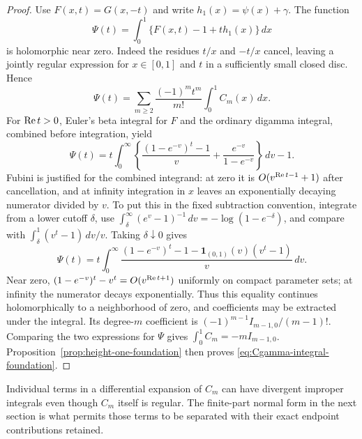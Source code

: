 \begin{proof}
Use $F(x,t)=G(x,-t)$ and write $h_1(x)=\psi(x)+\gamma$. The function
\[
 \Psi(t)=\int_0^1\{F(x,t)-1+t h_1(x)\}\,dx
\]
is holomorphic near zero. Indeed the residues $t/x$ and $-t/x$
cancel, leaving a jointly regular expression for $x\in[0,1]$ and
$t$ in a sufficiently small closed disc. Hence
\[
 \Psi(t)=\sum_{m\ge2}\frac{(-1)^m t^m}{m!}
                                  \int_0^1C_m(x)\,dx.
\]
For $\operatorname{Re} t>0$, Euler's beta integral for $F$ and the ordinary
digamma integral, combined before integration, yield
\[
 \Psi(t)=t\int_0^\infty
   \left\{\frac{(1-e^{-v})^t-1}{v}
                    +\frac{e^{-v}}{1-e^{-v}}\right\}\,dv-1.
\]
Fubini is justified for the combined integrand: at zero it is
$O(v^{\operatorname{Re} t-1}+1)$ after cancellation, and at infinity integration
in $x$ leaves an exponentially decaying numerator divided by $v$.
To put this in the fixed subtraction convention, integrate from a
lower cutoff $\delta$, use
$\int_\delta^\infty(e^v-1)^{-1}\,dv=-\log(1-e^{-\delta})$,
and compare with $\int_\delta^1(v^t-1)\,dv/v$. Taking
$\delta\downarrow0$ gives
\begin{equation}\label{eq:gamma-Psi-foundation}
 \Psi(t)=t\int_0^\infty
 \frac{(1-e^{-v})^t-1
       -\boldsymbol1_{(0,1)}(v)(v^t-1)}v\,dv.
\end{equation}
Near zero, $(1-e^{-v})^t-v^t=O(v^{\operatorname{Re} t+1})$ uniformly on compact
parameter sets; at infinity the numerator decays exponentially.
Thus this equality continues holomorphically to a neighborhood of zero,
and coefficients may be extracted under the integral. Its degree-$m$
coefficient is $(-1)^{m-1}I_{m-1,0}/(m-1)!$.
Comparing the two expressions for $\Psi$ gives
$\int_0^1C_m=-mI_{m-1,0}$. Proposition~\ref{prop:height-one-foundation}
then proves \eqref{eq:Cgamma-integral-foundation}.
\end{proof}

Individual terms in a differential expansion of $C_m$ can have divergent
improper integrals even though $C_m$ itself is regular. The finite-part
normal form in the next section is what permits those terms to be
separated with their exact endpoint contributions retained.
